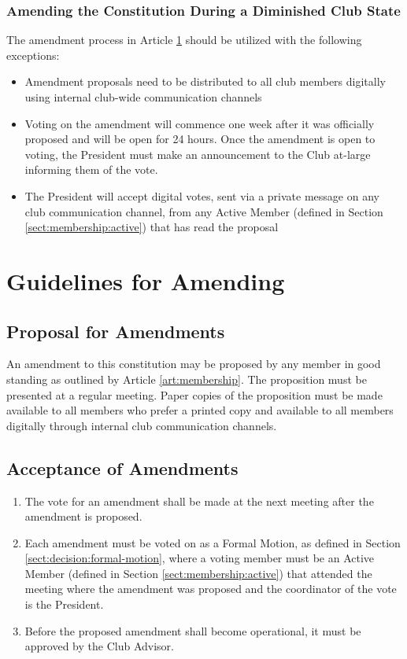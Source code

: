 \documentclass[english,11pt]{article}
\begin{document}
\subsubsection{Amending the Constitution During a Diminished Club State} \label{subsect:reduced:amending}
The amendment process in Article \ref{art:amending} should be utilized with the following exceptions:

\begin{itemize}
    \item Amendment proposals need to be distributed to all club members digitally using internal club-wide communication channels
    \item Voting on the amendment will commence one week after it was officially proposed and will be open for 24 hours.
        Once the amendment is open to voting, the President must make an announcement to the Club at-large informing them of the vote.
    \item The President will accept digital votes, sent via a private message on any club communication channel, from any Active Member (defined in Section \ref{sect:membership:active}) that has read the proposal
\end{itemize}

\section{Guidelines for Amending} \label{art:amending}

\subsection{Proposal for Amendments} \label{sect:amending:proposal}
An amendment to this constitution may be proposed by any member in good standing as outlined by Article \ref{art:membership}.
The proposition must be presented at a regular meeting.
Paper copies of the proposition must be made available to all members who prefer a printed copy and available to all members digitally through internal club communication channels.

\subsection{Acceptance of Amendments} \label{sect:amending:acceptance}
\begin{enumerate}[label=\Alph*.]
    \item The vote for an amendment shall be made at the next meeting after the amendment is proposed.
    \item Each amendment must be voted on as a Formal Motion, as defined in Section \ref{sect:decision:formal-motion}, where a voting member must be an Active Member (defined in Section \ref{sect:membership:active}) that attended the meeting where the amendment was proposed and the coordinator of the vote is the President.
    \item Before the proposed amendment shall become operational, it must be approved by the Club Advisor.
\end{enumerate}
\end{document}
